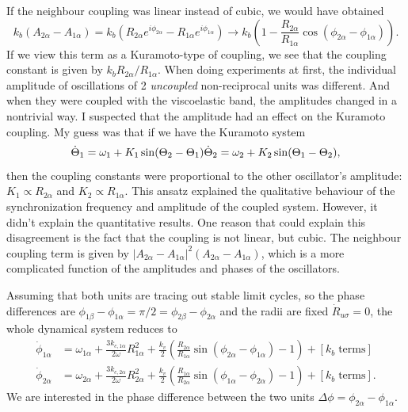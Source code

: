 \documentclass[11pt, a4paper]{article} %
\begin{document}
\begin{appendices}
If the neighbour coupling was linear instead of cubic, we would have obtained 
\begin{equation}
    k_b (A_{2\alpha} - A_{1\alpha}) = k_b (R_{2\alpha} e^{i\phi_{2\alpha}} - R_{1\alpha} e^{i\phi_{1\alpha}}) 
    \longrightarrow k_b \left( 1- \frac{R_{2\alpha}}{R_{1\alpha}} \cos(\phi_{2\alpha} - \phi_{1\alpha}) \right).
\end{equation}
If we view this term as a Kuramoto-type of coupling, we see that the coupling constant is given by $k_b R_{2\alpha}/R_{1\alpha}$. 
When doing experiments at first, the individual amplitude of oscillations of 2 \textit{uncoupled} non-reciprocal 
units was different. And when they were coupled with the viscoelastic band, the amplitudes changed in a nontrivial way. 
I suspected that the amplitude had an effect on the Kuramoto coupling. My guess was that if we have the Kuramoto system 
\begin{equation}
    \dot{\Theta}_1 = \omega_1 + K_1 \sin(\Theta_2 - \Theta_1) \\
    \dot{\Theta}_2 = \omega_2 + K_2 \sin(\Theta_1 - \Theta_2), 
\end{equation}
then the coupling constants were proportional to the other oscillator's amplitude: $K_1 \propto R_{2\alpha}$ and $K_2 \propto R_{1\alpha}$.
This ansatz explained the qualitative behaviour of the synchronization frequency and amplitude of the coupled system. 
However, it didn't explain the quantitative results. One reason that could explain this disagreement is 
the fact that the coupling is not linear, but cubic. 
The neighbour coupling term is given by $|A_{2\alpha} - A_{1\alpha}|^2 (A_{2\alpha} - A_{1\alpha})$, which is a more complicated function 
of the amplitudes and phases of the oscillators.

Assuming that both units are tracing out stable limit cycles, so the phase differences are 
$\phi_{1\beta} - \phi_{1\alpha} = \pi/2 = \phi_{2\beta} - \phi_{2\alpha}$
and the radii are fixed $\dot{R}_{u\sigma}=0$, the whole dynamical system reduces to 
\begin{align}
    \dot{\phi}_{1\alpha} &=  \omega_{1\alpha} + \frac{3k_{c,1\alpha}}{2\omega} R_{1\alpha}^2 
    + \frac{k_v}{2} \left(\frac{R_{2\alpha}}{R_{1\alpha}}\sin{(\phi_{2\alpha} - \phi_{1\alpha})} - 1\right) 
    + [k_b \;\text{terms}]\\
 \dot{\phi}_{2\alpha} &=  \omega_{2\alpha} + \frac{3k_{c,2\alpha}}{2\omega} R_{2\alpha}^2 
 + \frac{k_v}{2} \left(\frac{R_{1\alpha}}{R_{2\alpha}}\sin{(\phi_{1\alpha} - \phi_{2\alpha})} - 1\right) 
     + [k_b \;\text{terms}].
\end{align}
We are interested in the phase difference between the two units $\Delta\phi = \phi_{2\alpha} - \phi_{1\alpha}$. 


\end{appendices}
\end{document}
